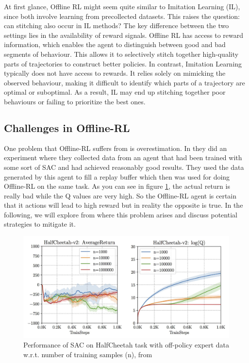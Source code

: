 At first glance, Offline RL might seem quite similar to Imitation Learning (IL), since both involve learning 
from precollected datasets. This raises the question: can stitching also occur in IL methods?\newline
The key difference between the two settings lies in the availability of reward signals. Offline RL has access
to reward information, which enables the agent to distinguish between good and bad segments of behaviour. This
allows it to selectively stitch together high-quality parts of trajectories to construct better policies.\newline
In contrast, Imitation Learning typically does not have access to rewards. It relies solely on mimicking the observed 
behaviour, making it difficult to identify which parts of a trajectory are optimal or suboptimal. As a result, IL may end up 
stitching together poor behaviours or failing to prioritize the best ones. 

\subsection{Challenges in Offline-RL}
One problem that Offline-RL suffers from is overestimation. In 
\cite{kumar2019stabilizingoffpolicyqlearningbootstrapping} they did an experiment where 
they collected data from an agent that had been trained with some sort of SAC and had 
achieved reasonably good results. They used the data generated by this agent to fill a 
replay buffer which then was used for doing Offline-RL on the same task. As you can see in 
figure \ref{off_rl_overestimation}, the actual return is really bad while the Q values are 
very high. So the Offline-RL agent is certain that it actions will lead to high reward but 
in reality the opposite is true. In the following, we will explore from where this problem arises
and discuss potential strategies to mitigate it.
\begin{figure}[H]
    \centering
    \includegraphics[width=0.72\linewidth]{images/off_rl_problem.png}
    \caption{Performance of SAC on HalfCheetah task with off-policy expert data 
    w.r.t. number of training samples (n), from \cite{kumar2019stabilizingoffpolicyqlearningbootstrapping}}
    \label{off_rl_overestimation}
\end{figure}

